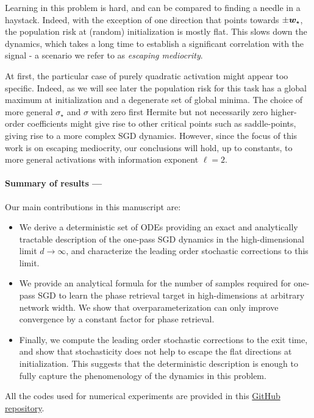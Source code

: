 Learning in this problem is hard, and can be compared to finding a needle in a haystack. Indeed, with the exception of one direction that points towards $\pm {\boldsymbol{w}}_{\star}$, the population risk at (random) initialization is mostly flat. This slows down the dynamics, which takes a long time to establish a significant correlation with the signal - a scenario we refer to as \emph{escaping mediocrity}. 

At first, the particular case of purely quadratic activation might appear too specific. Indeed, as we will see later the population risk for this task has a global maximum at initialization and a degenerate set of global minima. The choice of more general $\sigma_{\star}$ and $\sigma$ with zero first Hermite but not necessarily zero higher-order coefficients might give rise to other critical points such as saddle-points, giving rise to a more complex SGD dynamics. However, since the focus of this work is on escaping mediocrity, our conclusions will hold, up to constants, to more general activations with information exponent \(\ell=2\).

\paragraph{Summary of results ---} Our main contributions in this manuscript are: 
\begin{itemize}
    \item We derive a deterministic set of ODEs providing an exact and analytically tractable description of the one-pass SGD dynamics in the high-dimensional limit $d\to\infty$, and characterize the leading order stochastic corrections to this limit. 
    \item We provide an analytical formula for the number of samples required for one-pass SGD to learn the phase retrieval target in high-dimensions at arbitrary network width. We show that overparameterization can only improve convergence by a constant factor for phase retrieval.
    \item Finally, we compute the leading order stochastic corrections to the exit time, and show that stochasticity does not help to escape the flat directions at initialization. This suggests that the deterministic description is enough to fully capture the phenomenology of the dynamics in this problem.
\end{itemize}

All the codes used for numerical experiments are provided in this \href{https://github.com/IdePHICS/EscapingMediocrity}{GitHub repository}.

